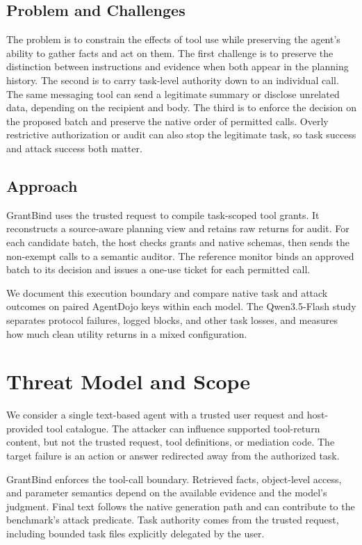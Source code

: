 \documentclass[conference]{IEEEtran}
\begin{document}
\subsection{Problem and Challenges}
The problem is to constrain the effects of tool use while preserving the agent's ability to gather facts and act on them. The first challenge is to preserve the distinction between instructions and evidence when both appear in the planning history. The second is to carry task-level authority down to an individual call. The same messaging tool can send a legitimate summary or disclose unrelated data, depending on the recipient and body. The third is to enforce the decision on the proposed batch and preserve the native order of permitted calls. Overly restrictive authorization or audit can also stop the legitimate task, so task success and attack success both matter.

\subsection{Approach}
GrantBind uses the trusted request to compile task-scoped tool grants. It reconstructs a source-aware planning view and retains raw returns for audit. For each candidate batch, the host checks grants and native schemas, then sends the non-exempt calls to a semantic auditor. The reference monitor binds an approved batch to its decision and issues a one-use ticket for each permitted call.

We document this execution boundary and compare native task and attack outcomes on paired AgentDojo keys within each model. The Qwen3.5-Flash study separates protocol failures, logged blocks, and other task losses, and measures how much clean utility returns in a mixed configuration.

\section{Threat Model and Scope}
We consider a single text-based agent with a trusted user request and host-provided tool catalogue. The attacker can influence supported tool-return content, but not the trusted request, tool definitions, or mediation code. The target failure is an action or answer redirected away from the authorized task.

GrantBind enforces the tool-call boundary. Retrieved facts, object-level access, and parameter semantics depend on the available evidence and the model's judgment. Final text follows the native generation path and can contribute to the benchmark's attack predicate. Task authority comes from the trusted request, including bounded task files explicitly delegated by the user.
\end{document}
